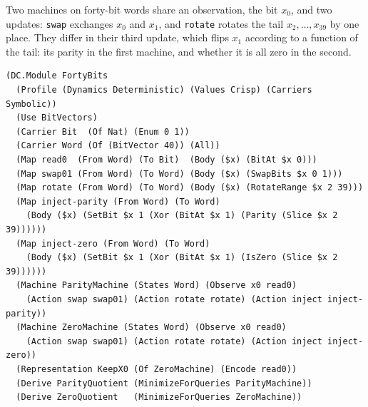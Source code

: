 \documentclass[11pt]{article}
\newcommand{\code}[1]{\texttt{#1}}
\theoremstyle{definition}
\theoremstyle{plain}
\begin{document}
Two machines on forty-bit words share an observation, the bit $x_0$, and two updates: \code{swap}
exchanges $x_0$ and $x_1$, and \code{rotate} rotates the tail $x_2,\dots,x_{39}$ by one place. They
differ in their third update, which flips $x_1$ according to a function of the tail: its parity in
the first machine, and whether it is all zero in the second.

\begin{lstlisting}[basicstyle=\ttfamily\footnotesize,title={\scriptsize\ttfamily fixtures/forty\_bits.metta}]
(DC.Module FortyBits
  (Profile (Dynamics Deterministic) (Values Crisp) (Carriers Symbolic))
  (Use BitVectors)
  (Carrier Bit  (Of Nat) (Enum 0 1))
  (Carrier Word (Of (BitVector 40)) (All))
  (Map read0  (From Word) (To Bit)  (Body ($x) (BitAt $x 0)))
  (Map swap01 (From Word) (To Word) (Body ($x) (SwapBits $x 0 1)))
  (Map rotate (From Word) (To Word) (Body ($x) (RotateRange $x 2 39)))
  (Map inject-parity (From Word) (To Word)
    (Body ($x) (SetBit $x 1 (Xor (BitAt $x 1) (Parity (Slice $x 2 39))))))
  (Map inject-zero (From Word) (To Word)
    (Body ($x) (SetBit $x 1 (Xor (BitAt $x 1) (IsZero (Slice $x 2 39))))))
  (Machine ParityMachine (States Word) (Observe x0 read0)
    (Action swap swap01) (Action rotate rotate) (Action inject inject-parity))
  (Machine ZeroMachine (States Word) (Observe x0 read0)
    (Action swap swap01) (Action rotate rotate) (Action inject inject-zero))
  (Representation KeepX0 (Of ZeroMachine) (Encode read0))
  (Derive ParityQuotient (MinimizeForQueries ParityMachine))
  (Derive ZeroQuotient   (MinimizeForQueries ZeroMachine))
\end{lstlisting}
\end{document}
